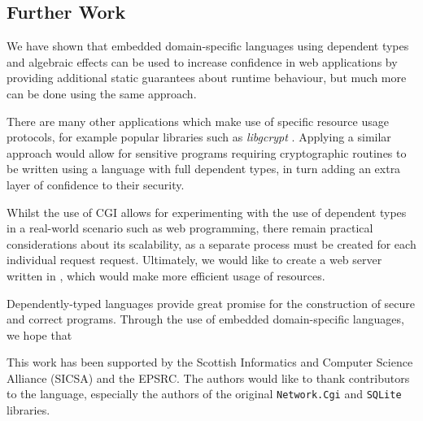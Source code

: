 \documentclass[preprint]{sigplanconf}
\begin{document}
\subsection{Further Work}
We have shown that embedded domain-specific languages using dependent types and algebraic effects can be used to increase confidence in web applications by providing additional static guarantees about runtime behaviour, but much more can be done using the same approach.

There are many other applications which make use of specific resource usage protocols, for example popular libraries such as \textit{libgcrypt} \cite{libgcrypt}. Applying a similar approach would allow for sensitive programs requiring cryptographic routines to be written using a language with full dependent types, in turn adding an extra layer of confidence to their security. 

Whilst the use of CGI allows for experimenting with the use of dependent types in a real-world scenario such as web programming, there remain practical considerations about its scalability, as a separate process must be created for each individual request request. Ultimately, we would like to create a web server written in \idris{}, which would make more efficient usage of resources. 

Dependently-typed languages provide great promise for the construction of secure and correct programs. Through the use of embedded domain-specific languages, we hope that





\acks
This work has been supported by the Scottish Informatics and Computer Science Alliance (SICSA) and the EPSRC. The authors would like to thank contributors to the \idris{} language, especially the authors of the original \texttt{Network.Cgi} and \texttt{SQLite} libraries.






%
%
\end{document}
